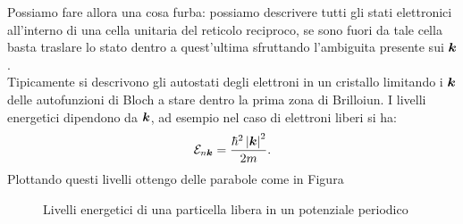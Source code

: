 Possiamo fare allora una cosa furba: possiamo descrivere tutti gli stati elettronici all'interno di una cella unitaria del reticolo reciproco, se sono fuori da tale cella basta traslare lo stato dentro a quest'ultima sfruttando l'ambiguita presente sui $\boldsymbol{k}$.\\
Tipicamente si descrivono gli autostati degli elettroni in un cristallo limitando i $\boldsymbol{k}$ delle autofunzioni di Bloch a stare dentro la prima zona di Brilloiun. I livelli energetici dipendono da $\boldsymbol{k}$, ad esempio nel caso di elettroni liberi si ha:
\[
	\mathcal{E}_{n\boldsymbol{k}}=
	\frac{\hbar^2\left|\boldsymbol{k}\right|^2}{2m}
.\] 
Plottando questi livelli ottengo delle parabole come in Figura 
\begin{figure}[ht]
    \centering
    \caption{Livelli energetici di una particella libera in un potenziale periodico}
    \label{fig:livelli-energetici-di-una-particella-libera-in-un-potenziale-periodico}
\end{figure}
